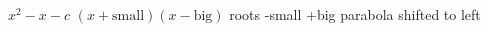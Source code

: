 \documentclass[12pt, a4paper]{exam}
\newcommand{\monicquad}[2]{%
    x^2%
    \ifnum\numexpr#1+#2>0 + \the\numexpr#1+#2\relax \else \ifnum\numexpr#1+#2<0 \the\numexpr#1+#2\relax \fi\fi%
    \ifnum\numexpr#1+#2=0 \else x\fi%
    \ifnum\numexpr#1*#2>0 + \the\numexpr#1*#2\relax \else \ifnum\numexpr#1*#2<0 \the\numexpr#1*#2\relax \fi\fi%
}
\newcommand{\Largespace}{\vspace{44mm}}
\begin{document}
\begin{questions}
\begin{parts}\Large
{}\Largespace
\end{parts}
\Largespace




\newpage




\question 
$x^2 - x -c$ \quad
 $(x+\text{small} )(x - \text{big} )$  \quad
 roots  -small +big
   \quad parabola shifted to left

\begin{parts}\Large
{}\Largespace
        \begin{multicols}{3}

\end{multicols}
\end{parts}
\end{questions}
\end{document}
